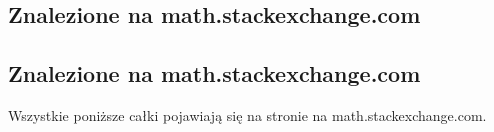 %

\subsection{Znalezione na math.stackexchange.com}
\subsection{Znalezione na math.stackexchange.com} %
Wszystkie poniższe całki pojawiają się na stronie na math.stackexchange.com.

%